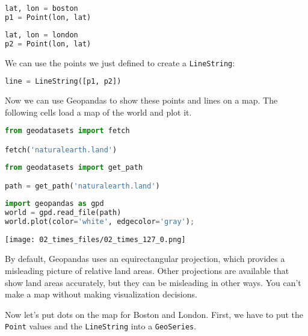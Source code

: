 \begin{lstlisting}[language=Python,style=source]
lat, lon = boston
p1 = Point(lon, lat)
\end{lstlisting}

\begin{lstlisting}[language=Python,style=source]
lat, lon = london
p2 = Point(lon, lat)
\end{lstlisting}

We can use the points we just defined to create a
\passthrough{\lstinline!LineString!}:

\begin{lstlisting}[language=Python,style=source]
line = LineString([p1, p2])
\end{lstlisting}

Now we can use Geopandas to show these points and lines on a map. The
following cells load a map of the world and plot it.

\begin{lstlisting}[language=Python,style=source]
from geodatasets import fetch

fetch('naturalearth.land')
\end{lstlisting}

\begin{lstlisting}[language=Python,style=source]
from geodatasets import get_path

path = get_path('naturalearth.land')
\end{lstlisting}

\begin{lstlisting}[language=Python,style=source]
import geopandas as gpd
world = gpd.read_file(path)
world.plot(color='white', edgecolor='gray');
\end{lstlisting}

\begin{center}
\texttt{[image: 02\_times\_files/02\_times\_127\_0.png]}
\end{center}

By default, Geopandas uses an equirectangular projection, which provides
a misleading picture of relative land areas. Other projections are
available that show land areas accurately, but they can be misleading in
other ways. You can't make a map without making visualization decisions.

Now let's put dots on the map for Boston and London. First, we have to
put the \passthrough{\lstinline!Point!} values and the
\passthrough{\lstinline!LineString!} into a
\passthrough{\lstinline!GeoSeries!}.

